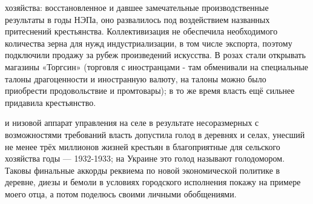 хозяйства: восстановленное и давшее замечательные производственные результаты в годы НЭПа, оно развалилось под воздействием названных притеснений крестьянства. Коллективизация не обеспечила необходимого количества зерна для нужд индустриализации, в том числе экспорта, поэтому подключили продажу за рубеж произведений искусства. В розах стали открывать магазины «Торгсин» (торговля с иностранцами - там обменивали на специальные талоны драгоценности и иностранную валюту, на талоны можно было приобрести продовольствие и промтовары); в то же время власть ещё сильнее придавила крестьянство.

и низовой аппарат управления на селе в результате несоразмерных с возможностями требований власть допустила голод в деревнях и селах, унесший не менее трёх миллионов жизней крестьян в благоприятные для сельского хозяйства годы — 1932-1933; на Украине это голод называют голодомором. Таковы финальные аккорды реквиема по новой экономической политике в деревне, диезы и бемоли в условиях городского исполнения покажу на примере моего отца, а потом поделюсь своими личными обобщениями.